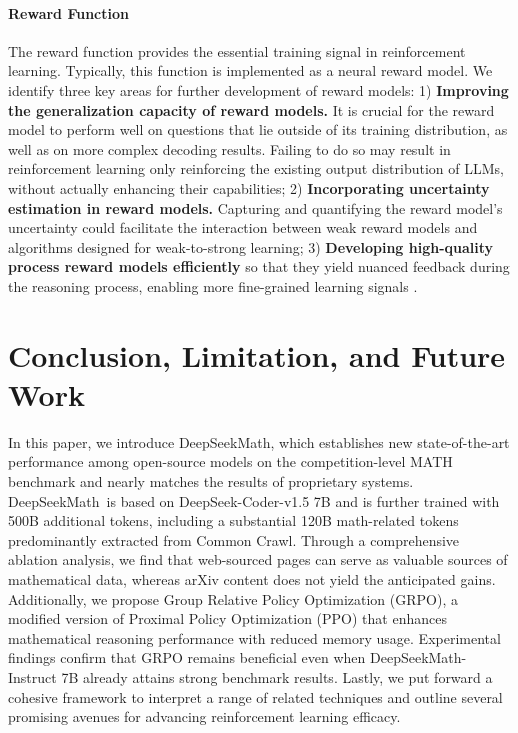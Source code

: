 \begin{itemize}[topsep=0pt]
\begin{itemize}[topsep=0pt]
\paragraph{Reward Function} The reward function provides the essential training signal in reinforcement learning. Typically, this function is implemented as a neural reward model. We identify three key areas for further development of reward models: 1) \textbf{Improving the generalization capacity of reward models.} It is crucial for the reward model to perform well on questions that lie outside of its training distribution, as well as on more complex decoding results. Failing to do so may result in reinforcement learning only reinforcing the existing output distribution of LLMs, without actually enhancing their capabilities; 2) \textbf{Incorporating uncertainty estimation in reward models.} Capturing and quantifying the reward model’s uncertainty could facilitate the interaction between weak reward models and algorithms designed for weak-to-strong learning; 3) \textbf{Developing high-quality process reward models efficiently} so that they yield nuanced feedback during the reasoning process, enabling more fine-grained learning signals \citep{lightman2023let,wang2023math}.

\section{Conclusion, Limitation, and Future Work} 

In this paper, we introduce DeepSeekMath, which establishes new state-of-the-art performance among open-source models on the competition-level MATH benchmark and nearly matches the results of proprietary systems. DeepSeekMath~is based on DeepSeek-Coder-v1.5 7B and is further trained with 500B additional tokens, including a substantial 120B math-related tokens predominantly extracted from Common Crawl. Through a comprehensive ablation analysis, we find that web-sourced pages can serve as valuable sources of mathematical data, whereas arXiv content does not yield the anticipated gains. Additionally, we propose Group Relative Policy Optimization (GRPO), a modified version of Proximal Policy Optimization (PPO) that enhances mathematical reasoning performance with reduced memory usage. Experimental findings confirm that GRPO remains beneficial even when DeepSeekMath-Instruct 7B already attains strong benchmark results. Lastly, we put forward a cohesive framework to interpret a range of related techniques and outline several promising avenues for advancing reinforcement learning efficacy.


\end{itemize}
\end{itemize}
